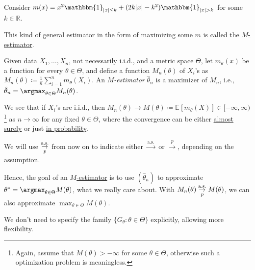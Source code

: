 \begin{eg}
	Consider \(m(x) = x^2 \mathbbm{1}_{\lvert x \rvert \leq k} + (2k\lvert x \rvert - k^2) \mathbbm{1}_{\lvert x \rvert > k} \) for some \(k \in \mathbb{R} \).
\end{eg}

This kind of general estimator in the form of maximizing some \(m\) is called the \hyperref[def:M-estimator]{\(M\)-estimator}.

\begin{definition}[\(M\)-estimator]\label{def:M-estimator}
	Given data \(X_1, \dots , X_n \), not necessarily i.i.d., and a metric space \(\Theta \), let \(m_\theta (x)\) be a function for every \(\theta \in \Theta \), and define a function \(M_n(\theta )\) of \(X_i\)'s as \(M_n (\theta ) \coloneqq \frac{1}{n} \sum_{i=1}^{n} m_\theta (X_i)\). An \emph{\(M\)-estimator} \(\hat{\theta} _n\) is a maximizer of \(M_n\), i.e., \(\hat{\theta} _n = \argmax_{\theta \in \Theta } M_n(\theta )\).
\end{definition}

We see that if \(X_i\)'s are i.i.d., then \(M_n(\theta ) \to M(\theta ) \coloneqq \mathbb{E}_{}[m_\theta (X)] \in [-\infty , \infty )\)\footnote{Again, assume that \(M(\theta ) > -\infty \) for some \(\theta  \in \Theta \), otherwise such a optimization problem is meaningless.} as \(n \to \infty \) for any fixed \(\theta \in \Theta \), where the convergence can be either \hyperref[def:converge-almost-surely]{almost surely} or just \hyperref[def:converge-in-probability]{in probability}.

\begin{notation}
	We will use \(\overunderset{\text{a.s.}}{p}{\to } \) from now on to indicate either \(\overset{\text{a.s.} }{\to} \) or \(\overset{p}{\to} \), depending on the assumption.
\end{notation}

Hence, the goal of an \hyperref[def:M-estimator]{\(M\)-estimator} is to use \((\hat{\theta} _n)\) to approximate \(\theta ^{\ast} = \argmax_{\theta \in \Theta } M(\theta )\), what we really care about. With \(M_n(\theta ) \overunderset{\text{a.s.}}{p}{\to } M(\theta )\), we can also approximate \(\max_{\theta \in \Theta } M(\theta )\).

\begin{intuition}
	We don't need to specify the family \(\{ G_\theta \colon \theta \in \Theta  \} \) explicitly, allowing more flexibility.
\end{intuition}

